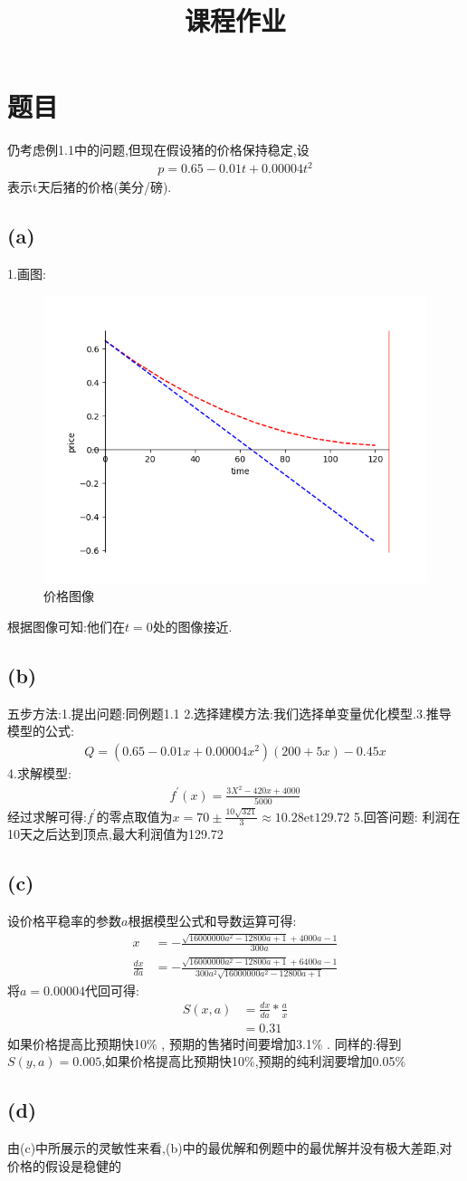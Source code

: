 \documentclass[lang=cn,11pt,a4paper]{elegantpaper}
\date{\zhtoday}
\title{课程作业}
\begin{document}
\maketitle
\section{题目}
仍考虑例1.1中的问题,但现在假设猪的价格保持稳定,设\begin{align}
    p = 0.65 - 0.01t +0.00004t^2
\end{align}表示t天后猪的价格(美分/磅).
\subsection{(a)}
1.画图:
\begin{figure}[h]
    \centering
    \includegraphics[width=0.5\linewidth]{1.png}
    \caption{价格图像}
    \label{价格图像}
\end{figure}
根据图像可知:他们在\(t=0\)处的图像接近.
\subsection{(b)}
五步方法:1.提出问题:同例题1.1
2.选择建模方法:我们选择单变量优化模型.3.推导模型的公式:
\begin{align*}
    Q=(0.65 - 0.01x +0.00004x^2)(200+5x)-0.45x
\end{align*}
4.求解模型:
\begin{align*}
    f^{'}(x)=\frac{3X^2 -420x +4000}{5000} 
\end{align*}
经过求解可得:\(f^{'}\)的零点取值为\(x= 70 \pm \frac{10\sqrt{321}}{3} \approx 10.28 \text{et} 129.72\) 
5.回答问题:
利润在10天之后达到顶点,最大利润值为129.72
\subsection{(c)}
设价格平稳率的参数\(a\)根据模型公式和导数运算可得:
\begin{align*}
    x &= -\frac{\sqrt{16000000a^2-12800a +1}+4000a -1}{300a} \\
    \frac{dx}{da} &= -\frac{\sqrt{16000000a^2 -12800a +1}+6400a -1}{300a^2\sqrt{16000000a^2 -12800a +1}}
\end{align*}
将\(a=0.00004\)代回可得:
\begin{align*}
    S(x,a) &= \frac{dx}{da} * \frac{a}{x} \\ 
    &=0.31
\end{align*}
如果价格提高比预期快10\% , 预期的售猪时间要增加3.1\% .
同样的:得到\(S(y,a) = 0.005\),如果价格提高比预期快10\%,预期的纯利润要增加0.05\%
\subsection{(d)}
由(c)中所展示的灵敏性来看,(b)中的最优解和例题中的最优解并没有极大差距,对价格的假设是稳健的
\end{document}
